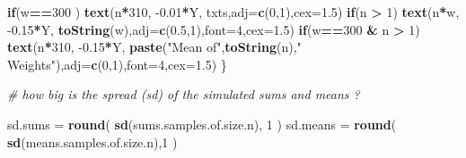 \documentclass[]{book}
\newenvironment{Shaded}{\begin{snugshade}}{\end{snugshade}}
\newcommand{\CommentTok}[1]{\textcolor[rgb]{0.56,0.35,0.01}{\textit{#1}}}
\newcommand{\ControlFlowTok}[1]{\textcolor[rgb]{0.13,0.29,0.53}{\textbf{#1}}}
\newcommand{\DataTypeTok}[1]{\textcolor[rgb]{0.13,0.29,0.53}{#1}}
\newcommand{\DecValTok}[1]{\textcolor[rgb]{0.00,0.00,0.81}{#1}}
\newcommand{\FloatTok}[1]{\textcolor[rgb]{0.00,0.00,0.81}{#1}}
\newcommand{\KeywordTok}[1]{\textcolor[rgb]{0.13,0.29,0.53}{\textbf{#1}}}
\newcommand{\NormalTok}[1]{#1}
\newcommand{\OperatorTok}[1]{\textcolor[rgb]{0.81,0.36,0.00}{\textbf{#1}}}
\newcommand{\StringTok}[1]{\textcolor[rgb]{0.31,0.60,0.02}{#1}}
\begin{document}
\begin{Shaded}
\begin{Highlighting}[]
     \ControlFlowTok{if}\NormalTok{(w}\OperatorTok{==}\DecValTok{300}\NormalTok{ ) }\KeywordTok{text}\NormalTok{(n}\OperatorTok{*}\DecValTok{310}\NormalTok{, }\FloatTok{-0.01}\OperatorTok{*}\NormalTok{Y,}
\NormalTok{          txts,}\DataTypeTok{adj=}\KeywordTok{c}\NormalTok{(}\DecValTok{0}\NormalTok{,}\DecValTok{1}\NormalTok{),}\DataTypeTok{cex=}\FloatTok{1.5}\NormalTok{)}
     \ControlFlowTok{if}\NormalTok{(n }\OperatorTok{>}\StringTok{ }\DecValTok{1}\NormalTok{) }\KeywordTok{text}\NormalTok{(n}\OperatorTok{*}\NormalTok{w, }\FloatTok{-0.15}\OperatorTok{*}\NormalTok{Y, }\KeywordTok{toString}\NormalTok{(w),}\DataTypeTok{adj=}\KeywordTok{c}\NormalTok{(}\FloatTok{0.5}\NormalTok{,}\DecValTok{1}\NormalTok{),}\DataTypeTok{font=}\DecValTok{4}\NormalTok{,}\DataTypeTok{cex=}\FloatTok{1.5}\NormalTok{)}
     \ControlFlowTok{if}\NormalTok{(w}\OperatorTok{==}\DecValTok{300} \OperatorTok{&}\StringTok{ }\NormalTok{n }\OperatorTok{>}\StringTok{ }\DecValTok{1}\NormalTok{) }\KeywordTok{text}\NormalTok{(n}\OperatorTok{*}\DecValTok{310}\NormalTok{, }\FloatTok{-0.15}\OperatorTok{*}\NormalTok{Y,}
          \KeywordTok{paste}\NormalTok{(}\StringTok{"Mean of"}\NormalTok{,}\KeywordTok{toString}\NormalTok{(n),}\StringTok{" Weights"}\NormalTok{),}\DataTypeTok{adj=}\KeywordTok{c}\NormalTok{(}\DecValTok{0}\NormalTok{,}\DecValTok{1}\NormalTok{),}\DataTypeTok{font=}\DecValTok{4}\NormalTok{,}\DataTypeTok{cex=}\FloatTok{1.5}\NormalTok{)}
\NormalTok{   \}}
   
   \CommentTok{# how big is the spread (sd) of the simulated sums and means ?}
   
\NormalTok{   sd.sums  =}\StringTok{ }\KeywordTok{round}\NormalTok{( }\KeywordTok{sd}\NormalTok{(sums.samples.of.size.n), }\DecValTok{1}\NormalTok{ )}
\NormalTok{   sd.means =}\StringTok{ }\KeywordTok{round}\NormalTok{( }\KeywordTok{sd}\NormalTok{(means.samples.of.size.n),}\DecValTok{1}\NormalTok{ )}
   

\end{Highlighting}
\end{Shaded}
\end{document}

